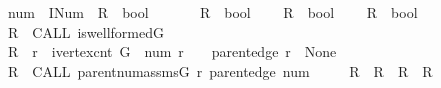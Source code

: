 \begin{isabellebody}
\ \ \ \ num\ {\isacharcolon}{\isacharcolon}\ INum\ {\isacharbar}\ R\ {\isacharcolon}{\isacharcolon}\ bool{\isacharparenright}\isanewline
\ \ \isanewline
\ \ \ \ R{}\ {\isacharcolon}{\isacharcolon}\ bool\isanewline
\ \ \ \ R{}\ {\isacharcolon}{\isacharcolon}\ bool\isanewline
\ \ \ \ R{}\ {\isacharcolon}{\isacharcolon}\ bool\isanewline
\ \ \ {\isachardoublequoteopen}\isanewline
\ \ \ \ {\isasymacute}R{}\ {\isacharcolon}{\isacharequal}{\isacharequal}\ CALL\ is{\isacharunderscore}wellformed{\isacharparenleft}{\isasymacute}G{\isacharparenright}\ {\isacharsemicolon}{\isacharsemicolon}\isanewline
\ \ \ \ {\isasymacute}R{}\ {\isacharcolon}{\isacharequal}{\isacharequal}\ {\isasymacute}r\ {\isacharless}\ ivertex{\isacharunderscore}cnt\ {\isasymacute}G\ {\isasymand}\ {\isasymacute}num\ {\isasymacute}r\ {\isacharequal}\ {}\ {\isasymand}\ {\isasymacute}parent{\isacharunderscore}edge\ {\isasymacute}r\ {\isacharequal}\ None\ {\isacharsemicolon}{\isacharsemicolon}\isanewline
\ \ \ \ {\isasymacute}R{}\ {\isacharcolon}{\isacharequal}{\isacharequal}\ CALL\ parent{\isacharunderscore}num{\isacharunderscore}assms{\isacharparenleft}{\isasymacute}G{\isacharcomma}\ {\isasymacute}r{\isacharcomma}\ {\isasymacute}parent{\isacharunderscore}edge{\isacharcomma}\ {\isasymacute}num{\isacharparenright}\ {\isacharsemicolon}{\isacharsemicolon}\isanewline
\ \ \ \ {\isasymacute}R\ {\isacharcolon}{\isacharequal}{\isacharequal}\ {\isasymacute}R{}\ {\isasymand}\ {\isasymacute}R{}\ {\isasymand}\ {\isasymacute}R{}{\isachardoublequoteclose}\isanewline
%
\isadelimtheory
\isanewline
%
\endisadelimtheory
%
\isatagtheory
{}\isamarkupfalse%
%
\endisatagtheory
{\isafoldtheory}%
%
\isadelimtheory
%
\endisadelimtheory
\end{isabellebody}%
